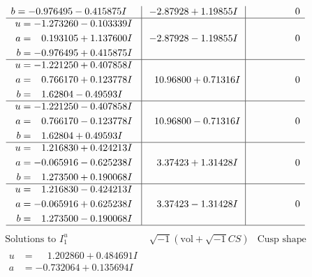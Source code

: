 \documentclass[1p]{elsarticle_modified}
\theoremstyle{definition}
\newcommand{\I}{\sqrt{-1}}
\begin{document}
$$\begin{array}{c|c|c}
\begin{aligned}
b &= -0.976495 - 0.415875 I\end{aligned}
 & -2.87928 + 1.19855 I & \phantom{-0.000000 } 0 \\ \hline\begin{aligned}
u &= -1.273260 - 0.103339 I \\
a &= \phantom{-}0.193105 + 1.137600 I \\
b &= -0.976495 + 0.415875 I\end{aligned}
 & -2.87928 - 1.19855 I & \phantom{-0.000000 } 0 \\ \hline\begin{aligned}
u &= -1.221250 + 0.407858 I \\
a &= \phantom{-}0.766170 + 0.123778 I \\
b &= \phantom{-}1.62804 - 0.49593 I\end{aligned}
 & \phantom{-}10.96800 + 0.71316 I & \phantom{-0.000000 } 0 \\ \hline\begin{aligned}
u &= -1.221250 - 0.407858 I \\
a &= \phantom{-}0.766170 - 0.123778 I \\
b &= \phantom{-}1.62804 + 0.49593 I\end{aligned}
 & \phantom{-}10.96800 - 0.71316 I & \phantom{-0.000000 } 0 \\ \hline\begin{aligned}
u &= \phantom{-}1.216830 + 0.424213 I \\
a &= -0.065916 - 0.625238 I \\
b &= \phantom{-}1.273500 + 0.190068 I\end{aligned}
 & \phantom{-}3.37423 + 1.31428 I & \phantom{-0.000000 } 0 \\ \hline\begin{aligned}
u &= \phantom{-}1.216830 - 0.424213 I \\
a &= -0.065916 + 0.625238 I \\
b &= \phantom{-}1.273500 - 0.190068 I\end{aligned}
 & \phantom{-}3.37423 - 1.31428 I & \phantom{-0.000000 } 0\\
 \hline 
 \end{array}$$\newpage$$\begin{array}{c|c|c}  
\text{Solutions to }I^u_{1}& \I (\text{vol} + \sqrt{-1}CS) & \text{Cusp shape}\\
 \hline 
\begin{aligned}
u &= \phantom{-}1.202860 + 0.484691 I \\
a &= -0.732064 + 0.135694 I \\

\end{aligned}
\end{array}$$
\end{document}

